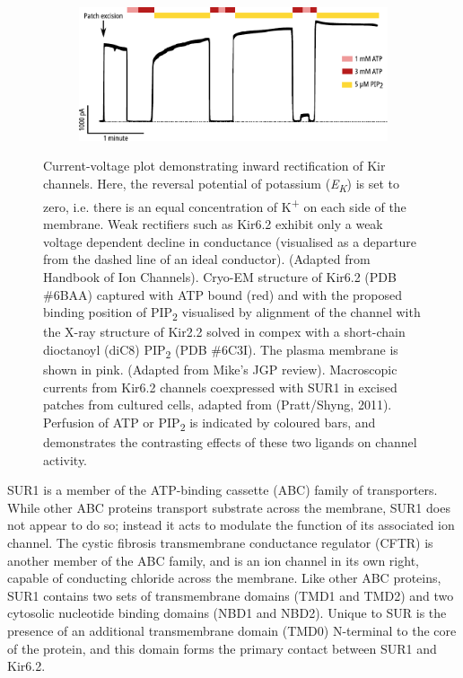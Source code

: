 \begin{figure}[h]
\begin{subfigure}[t]{0.9\textwidth}
		\centering
		\includegraphics[width=\textwidth]{shyng_atp_pip_trace.pdf}
	\end{subfigure}
	\caption[Structure of Kir6.2]{
		 Current-voltage plot demonstrating inward rectification of Kir channels.
		Here, the reversal potential of potassium (\textit{E\textsubscript{K}}) is set to zero, i.e. there is an equal concentration of K\textsuperscript{+} on each side of the membrane.
		Weak rectifiers such as Kir6.2 exhibit only a weak voltage dependent decline in conductance (visualised as a departure from the dashed line of an ideal conductor).
		(Adapted from Handbook of Ion Channels).
		 Cryo-EM structure of Kir6.2 (PDB \#6BAA) captured with ATP bound (red) and with the proposed binding position of PIP\textsubscript{2} visualised by alignment of the channel with the X-ray structure of Kir2.2 solved in compex with a short-chain dioctanoyl (diC8) PIP\textsubscript{2} (PDB \#6C3I).
		The plasma membrane is shown in pink.
		(Adapted from Mike's JGP review).
		 Macroscopic currents from Kir6.2 channels coexpressed with SUR1 in excised patches from cultured cells, adapted from (Pratt/Shyng, 2011).
		Perfusion of ATP or PIP\textsubscript{2} is indicated by coloured bars, and demonstrates the contrasting effects of these two ligands on channel activity.
	}
	\label{ch1fig:kir_breakdown}
\end{figure}

SUR1 is a member of the ATP-binding cassette (ABC) family of transporters.
While other ABC proteins transport substrate across the membrane, SUR1 does not appear to do so; instead it acts to modulate the function of its associated ion channel.
The cystic fibrosis transmembrane conductance regulator (CFTR) is another member of the ABC family, and is an ion channel in its own right, capable of conducting chloride across the membrane.
Like other ABC proteins, SUR1 contains two sets of transmembrane domains (TMD1 and TMD2) and two cytosolic nucleotide binding domains (NBD1 and NBD2).
Unique to SUR is the presence of an additional transmembrane domain (TMD0) N-terminal to the core of the protein, and this domain forms the primary contact between SUR1 and Kir6.2.

